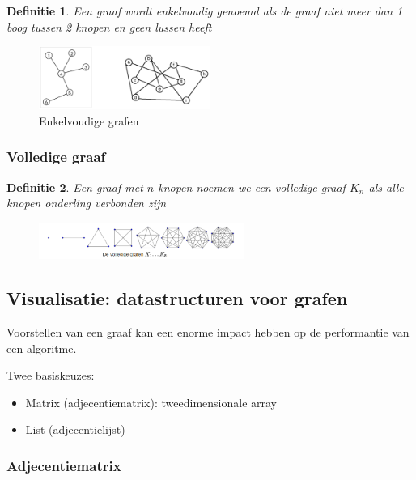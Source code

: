 \documentclass{article}
\newtheorem{theorem}{Definitie}[section]
\begin{document}
\begin{theorem}
    Een graaf wordt enkelvoudig genoemd als de graaf niet meer dan 1 boog tussen 2 knopen en geen lussen heeft
\end{theorem}

\begin{figure}[H]
    \centering
    \includegraphics[width=0.5\textwidth]{enkelvoudige-graaf.png}
    \caption{Enkelvoudige grafen}
\end{figure}

\subsubsection{Volledige graaf}

\begin{theorem}
    Een graaf met $n$ knopen noemen we een volledige graaf $K_n$ als alle knopen onderling verbonden zijn
\end{theorem}

\begin{figure}[H]
    \centering
    \includegraphics[width=0.6\textwidth]{volledige-grafen.png}
\end{figure}

\subsection{Visualisatie: datastructuren voor grafen}

Voorstellen van een graaf kan een enorme impact hebben op de performantie van een algoritme.

Twee basiskeuzes:

\begin{itemize}
    \item Matrix (adjecentiematrix): tweedimensionale array
    \item List (adjecentielijst)
\end{itemize}

\subsubsection{Adjecentiematrix}
\end{document}
